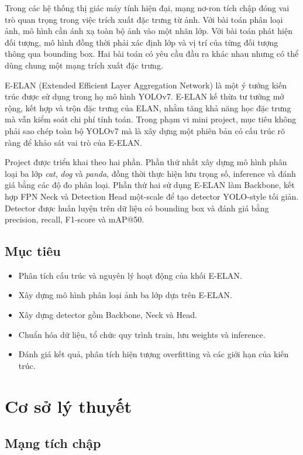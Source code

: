 \documentclass[12pt,a4paper]{article}
\begin{document}
Trong các hệ thống thị giác máy tính hiện đại, mạng nơ-ron tích chập đóng vai trò quan trọng trong việc trích xuất đặc trưng từ ảnh. Với bài toán phân loại ảnh, mô hình cần ánh xạ toàn bộ ảnh vào một nhãn lớp. Với bài toán phát hiện đối tượng, mô hình đồng thời phải xác định lớp và vị trí của từng đối tượng thông qua bounding box. Hai bài toán có yêu cầu đầu ra khác nhau nhưng có thể dùng chung một mạng trích xuất đặc trưng.

E-ELAN (Extended Efficient Layer Aggregation Network) là một ý tưởng kiến trúc được sử dụng trong họ mô hình YOLOv7. E-ELAN kế thừa tư tưởng mở rộng, kết hợp và trộn đặc trưng của ELAN, nhằm tăng khả năng học đặc trưng mà vẫn kiểm soát chi phí tính toán. Trong phạm vi mini project, mục tiêu không phải sao chép toàn bộ YOLOv7 mà là xây dựng một phiên bản có cấu trúc rõ ràng để khảo sát vai trò của E-ELAN.

Project được triển khai theo hai phần. Phần thứ nhất xây dựng mô hình phân loại ba lớp \textit{cat}, \textit{dog} và \textit{panda}, đồng thời thực hiện lưu trọng số, inference và đánh giá bằng các độ đo phân loại. Phần thứ hai sử dụng E-ELAN làm Backbone, kết hợp FPN Neck và Detection Head một-scale để tạo detector YOLO-style tối giản. Detector được huấn luyện trên dữ liệu có bounding box và đánh giá bằng precision, recall, F1-score và mAP@50.

\subsection{Mục tiêu}
\begin{itemize}[leftmargin=*]
  \item Phân tích cấu trúc và nguyên lý hoạt động của khối E-ELAN.
  \item Xây dựng mô hình phân loại ảnh ba lớp dựa trên E-ELAN.
  \item Xây dựng detector gồm Backbone, Neck và Head.
  \item Chuẩn hóa dữ liệu, tổ chức quy trình train, lưu weights và inference.
  \item Đánh giá kết quả, phân tích hiện tượng overfitting và các giới hạn của kiến trúc.
\end{itemize}

\section{Cơ sở lý thuyết}

\subsection{Mạng tích chập}
\end{document}

